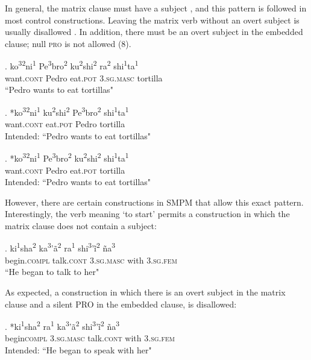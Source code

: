\documentclass[12pt]{article}
\begin{document}
In general, the matrix clause must have a subject \Next, and this pattern is followed in most control constructions. Leaving the matrix verb without an overt subject is usually disallowed \NNext. In addition, there must be an overt subject in the embedded clause; null \textsc{pro} is not allowed (8).

\exg. ko\textsuperscript{32}ni\textsuperscript{1} Pe\textsuperscript{3}bro\textsuperscript{2} ku\textsuperscript{2}shi\textsuperscript{2} ra\textsuperscript{2} shi\textsuperscript{1}ta\textsuperscript{1} \\
want.\textsc{cont} Pedro eat.\textsc{pot} \textsc{3.sg.masc} tortilla \\
``Pedro wants to eat tortillas"

\exg. *ko\textsuperscript{32}ni\textsuperscript{1} ku\textsuperscript{2}shi\textsuperscript{2} Pe\textsuperscript{3}bro\textsuperscript{2} shi\textsuperscript{1}ta\textsuperscript{1} \\
want.\textsc{cont} eat.\textsc{pot} Pedro tortilla \\
Intended: ``Pedro wants to eat tortillas"

\exg. *ko\textsuperscript{32}ni\textsuperscript{1} Pe\textsuperscript{3}bro\textsuperscript{2} ku\textsuperscript{2}shi\textsuperscript{2} shi\textsuperscript{1}ta\textsuperscript{1} \\
want.\textsc{cont} Pedro eat.\textsc{pot} tortilla \\
Intended: ``Pedro wants to eat tortillas"


However, there are certain constructions in SMPM that allow this exact pattern. Interestingly, the verb meaning `to start' permits a construction in which the matrix clause does not contain a subject:

\exg. ki\textsuperscript{1}sha\textsuperscript{2} ka\textsuperscript{3}'\~a\textsuperscript{2} ra\textsuperscript{1} shi\textsuperscript{3}'\~i\textsuperscript{2} \~na\textsuperscript{3} \\
begin.\textsc{compl} talk.\textsc{cont} \textsc{3.sg.masc} with \textsc{3.sg.fem}\\
``He began to talk to her"

As expected, a construction in which there is an overt subject in the matrix clause and a silent PRO in the embedded clause, is disallowed: 

\exg. *ki\textsuperscript{1}sha\textsuperscript{2} ra\textsuperscript{1} ka\textsuperscript{3}'\~a\textsuperscript{2} shi\textsuperscript{3}'\~i\textsuperscript{2} \~na\textsuperscript{3} \\
begin\textsc{compl} \textsc{3.sg.masc} talk.\textsc{cont} with \textsc{3.sg.fem} \\
Intended: ``He began to speak with her"
\end{document}

